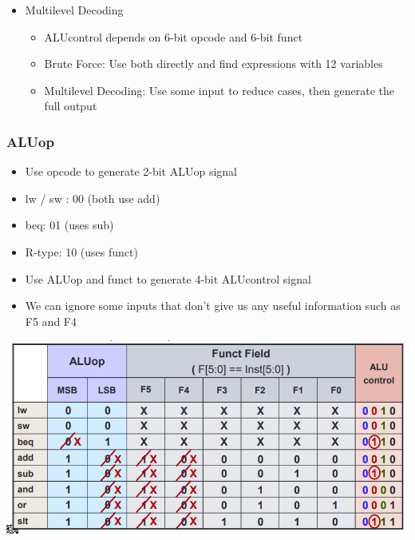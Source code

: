 \documentclass[10pt, portrait]{article}
\begin{document}
\begin{multicols*}{2}
\begin{center}
\end{center}
\begin{itemize}
    \item Multilevel Decoding
    \begin{itemize}
        \item ALUcontrol depends on 6-bit opcode and 6-bit funct
        \item Brute Force: Use both directly and find expressions with 12 variables
        \item Multilevel Decoding: Use some input to reduce cases, then generate the full output
    \end{itemize}
\end{itemize}

\subsubsection{ALUop}
\begin{itemize}
    \item Use opcode to generate 2-bit ALUop signal
    \item lw / sw : 00 (both use add)
    \item beq: 01 (uses sub)
    \item R-type: 10 (uses funct)
    \item Use ALUop and funct to generate 4-bit ALUcontrol signal
    \item We can ignore some inputs that don't give us any useful information such as F5 and F4
\end{itemize}
\begin{center}
    \includegraphics[width=\linewidth]{aluop table.png}
\end{center}


\end{multicols*}
\end{document}

